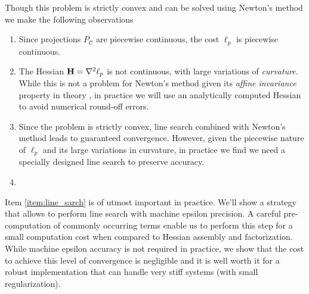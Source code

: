 Though this problem is strictly convex and can be solved using Newton's method
we make the following observations
\begin{enumerate}
	\item Since projections $P_\mathcal{C}$ are piecewise continuous, the cost
	$\ell_p$ is piecewise continuous.
      \item The Hessian ${\mathbf{H}}=\nabla^2\ell_p$ is not continuous, with large 
	variations of \textit{curvature}. While this is not a problem for Newton's
        method given its \textit{affine invariance} property in theory , in practice
	we will use an analytically computed Hessian to avoid numerical round-off
	errors.
	\item\label{item:line_sarch} Since the problem is strictly convex, line
	search combined with Newton's method leads to guaranteed convergence.
	However, given the piecewise nature of $\ell_p$ and its large variations in
	curvature, in practice we find we need a specially designed line search to
	preserve accuracy.

      \item~
\end{enumerate}

Item \ref{item:line_sarch} is of utmost important in practice. We'll show a
strategy that allows to perform line search with machine epsilon precision. A
careful pre-computation of commonly occurring terms enable us to perform this
step for a small computation cost when compared to Hessian assembly and
factorization. While machine epsilon accuracy is not required in practice, we
show that the cost to achieve this level of convergence is negligible and it is
well worth it for a robust implementation that can handle very stiff systems
(with small regularization).

